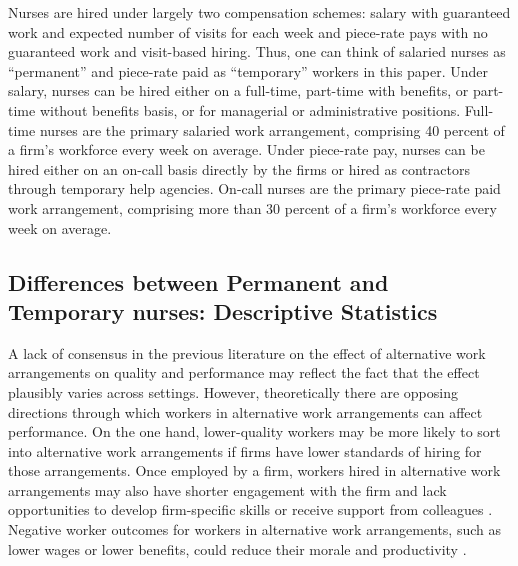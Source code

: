 \documentclass[final,12pt]{article}
\begin{document}
Nurses are hired under largely two compensation schemes: salary with guaranteed work and expected number of visits for each week and piece-rate pays with no guaranteed work and visit-based hiring.
Thus, one can think of salaried nurses as ``permanent'' and piece-rate paid as ``temporary'' workers in this paper.
Under salary, nurses can be hired either on a full-time, part-time with benefits, or part-time without benefits basis, or for managerial or administrative positions.
Full-time nurses are the primary salaried work arrangement, comprising 40 percent of a firm's workforce every week on average.
Under piece-rate pay, nurses can be hired either on an on-call basis directly by the firms or hired as contractors through temporary help agencies.
On-call nurses are the primary piece-rate paid work arrangement, comprising more than 30 percent of a firm's workforce every week on average.





\subsection{Differences between Permanent and Temporary nurses: Descriptive Statistics} \label{sec:desc_diff_nurses} %

A lack of consensus in the previous literature on the effect of alternative work arrangements on quality and performance may reflect the fact that the effect plausibly varies across settings.
However, theoretically there are opposing directions through which workers in alternative work arrangements can affect performance.
On the one hand, lower-quality workers may be more likely to sort into alternative work arrangements if firms have lower standards of hiring for those arrangements.
Once employed by a firm, workers hired in alternative work arrangements may also have shorter engagement with the firm and lack opportunities to develop firm-specific skills \citep{Broschak2006, Cuyper2008}
or receive support from colleagues \citep{Witte2003}.
Negative worker outcomes for workers in alternative work arrangements, such as lower wages or lower benefits, could reduce their morale and productivity \citep{Harley1994, Hockenberry2016}.
\end{document}
